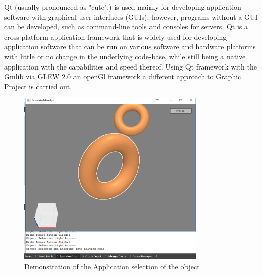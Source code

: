 \documentclass[a4,10pt]{article}
\begin{document}
	    Qt (usually pronounced as "cute",) is used mainly for developing application software with graphical user interfaces (GUIs);
	    however, programs without a GUI can be developed, such as command-line tools and consoles for servers.
	    Qt is a cross-platform application framework that is widely used
            for developing application software that can be run on various software and hardware platforms with little or no
            change in the underlying code-base, while still being a native application with the capabilities and speed thereof. Using Qt framework with the Gmlib via GLEW 2.0
            an openGl framework a different approach to Graphic Project is carried out.
	  
	    
            \begin{figure}[ht]
	      \centering
              \includegraphics[width=0.8\textwidth]{gfx/first_demo.png}
	      \caption{Demonstration of the Application selection of the object}
	      \label{fig:first_demo}
	    \end{figure}
	
	 
\end{document}

